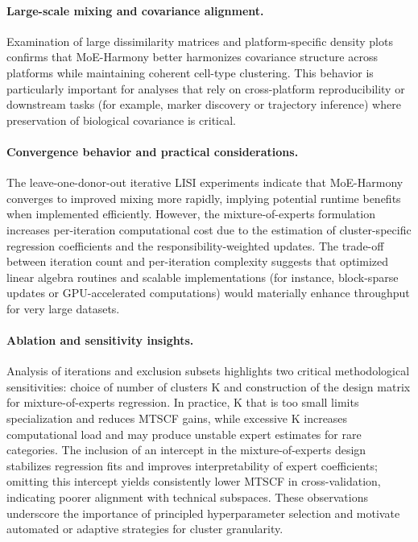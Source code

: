 \documentclass{article}
\begin{document}
\paragraph{Large-scale mixing and covariance alignment.} Examination of large dissimilarity matrices and platform-specific density plots confirms that MoE-Harmony better harmonizes covariance structure across platforms while maintaining coherent cell-type clustering. This behavior is particularly important for analyses that rely on cross-platform reproducibility or downstream tasks (for example, marker discovery or trajectory inference) where preservation of biological covariance is critical.

\paragraph{Convergence behavior and practical considerations.} The leave\hyp{}one\hyp{}donor\hyp{}out iterative LISI experiments indicate that MoE-Harmony converges to improved mixing more rapidly, implying potential runtime benefits when implemented efficiently. However, the mixture-of-experts formulation increases per-iteration computational cost due to the estimation of cluster-specific regression coefficients and the responsibility-weighted updates. The trade-off between iteration count and per-iteration complexity suggests that optimized linear algebra routines and scalable implementations (for instance, block-sparse updates or GPU-accelerated computations) would materially enhance throughput for very large datasets.

\paragraph{Ablation and sensitivity insights.} Analysis of iterations and exclusion subsets highlights two critical methodological sensitivities: choice of number of clusters K and construction of the design matrix for mixture-of-experts regression. In practice, K that is too small limits specialization and reduces MTSCF gains, while excessive K increases computational load and may produce unstable expert estimates for rare categories. The inclusion of an intercept in the mixture-of-experts design stabilizes regression fits and improves interpretability of expert coefficients; omitting this intercept yields consistently lower MTSCF in cross\hyp{}validation, indicating poorer alignment with technical subspaces. These observations underscore the importance of principled hyperparameter selection and motivate automated or adaptive strategies for cluster granularity.
\end{document}
